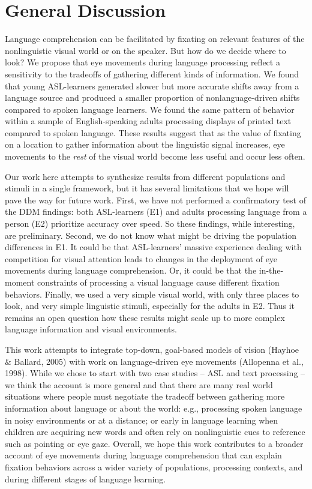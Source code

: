 \documentclass[10pt, letterpaper]{article}
\begin{document}
\section{General Discussion}\label{general-discussion}

Language comprehension can be facilitated by fixating on relevant
features of the nonlinguistic visual world or on the speaker. But how do
we decide where to look? We propose that eye movements during language
processing reflect a sensitivity to the tradeoffs of gathering different
kinds of information. We found that young ASL-learners generated slower
but more accurate shifts away from a language source and produced a
smaller proportion of nonlanguage-driven shifts compared to spoken
language learners. We found the same pattern of behavior within a sample
of English-speaking adults processing displays of printed text compared
to spoken language. These results suggest that as the value of fixating
on a location to gather information about the linguistic signal
increases, eye movements to the \emph{rest} of the visual world become
less useful and occur less often.

Our work here attempts to synthesize results from different populations
and stimuli in a single framework, but it has several limitations that
we hope will pave the way for future work. First, we have not performed
a confirmatory test of the DDM findings: both ASL-learners (E1) and
adults processing language from a person (E2) prioritize accuracy over
speed. So these findings, while interesting, are preliminary. Second, we
do not know what might be driving the population differences in E1. It
could be that ASL-learners' massive experience dealing with competition
for visual attention leads to changes in the deployment of eye movements
during language comprehension. Or, it could be that the in-the-moment
constraints of processing a visual language cause different fixation
behaviors. Finally, we used a very simple visual world, with only three
places to look, and very simple linguistic stimuli, especially for the
adults in E2. Thus it remains an open question how these results might
scale up to more complex language information and visual environments.

This work attempts to integrate top-down, goal-based models of vision
(Hayhoe \& Ballard, 2005) with work on language-driven eye movements
(Allopenna et al., 1998). While we chose to start with two case studies
-- ASL and text processing -- we think the account is more general and
that there are many real world situations where people must negotiate
the tradeoff between gathering more information about language or about
the world: e.g., processing spoken language in noisy environments or at
a distance; or early in language learning when children are acquiring
new words and often rely on nonlinguistic cues to reference such as
pointing or eye gaze. Overall, we hope this work contributes to a
broader account of eye movements during language comprehension that can
explain fixation behaviors across a wider variety of populations,
processing contexts, and during different stages of language learning.
\end{document}
